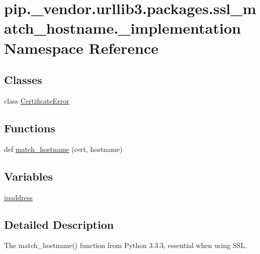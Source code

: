 \hypertarget{namespacepip_1_1__vendor_1_1urllib3_1_1packages_1_1ssl__match__hostname_1_1__implementation}{}\section{pip.\+\_\+vendor.\+urllib3.\+packages.\+ssl\+\_\+match\+\_\+hostname.\+\_\+implementation Namespace Reference}
\label{namespacepip_1_1__vendor_1_1urllib3_1_1packages_1_1ssl__match__hostname_1_1__implementation}
\subsection*{Classes}
\begin{DoxyCompactItemize}
\item 
class \hyperlink{classpip_1_1__vendor_1_1urllib3_1_1packages_1_1ssl__match__hostname_1_1__implementation_1_1CertificateError}{Certificate\+Error}
\end{DoxyCompactItemize}
\subsection*{Functions}
\begin{DoxyCompactItemize}
\item 
def \hyperlink{namespacepip_1_1__vendor_1_1urllib3_1_1packages_1_1ssl__match__hostname_1_1__implementation_ab0ddb7d7bb7cc93f470a4f1c1a244fe7}{match\+\_\+hostname} (cert, hostname)
\end{DoxyCompactItemize}
\subsection*{Variables}
\begin{DoxyCompactItemize}
\item 
\hyperlink{namespacepip_1_1__vendor_1_1urllib3_1_1packages_1_1ssl__match__hostname_1_1__implementation_ac80eca726dd9c6d28e1bcbf3a6453746}{ipaddress}
\end{DoxyCompactItemize}


\subsection{Detailed Description}
\begin{DoxyVerb}The match_hostname() function from Python 3.3.3, essential when using SSL.\end{DoxyVerb}
 

